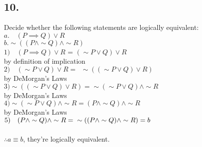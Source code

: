 \documentclass[12pt]{article}
\begin{document}
\begin{minipage}[t]{0.45\textwidth}
\subsection*{10.}
Decide whether the following statements are logically equivalent:\\
$ a.\quad(P \implies Q) \lor R $\\
$ b. \sim((P \land \sim Q) \land \sim R) $\\
$1) \quad (P \implies Q) \lor R $ = $ (\sim P \lor Q) \lor R$ \\by definition of implication\\
$ 2) \quad (\sim P \lor Q) \lor R =  \enspace \sim((\sim P \lor Q) \lor R)$\\
by DeMorgan's Laws\\
$ 3) \sim((\sim P \lor Q) \lor R) = \sim(\sim P \lor Q) \land \sim R $\\
by DeMorgan's Laws\\
$ 4) \sim(\sim P \lor Q) \land \sim R = (P \land \sim Q) \land \sim R$\\
by DeMorgan's Laws\\
$ 5)\quad (P \land \sim Q) \land \sim R =\\ \sim ((P \land \sim Q) \land \sim R) = b$\\\\
$\therefore a \equiv b $, they're logically equivalent.
\end{minipage}
\end{document}
